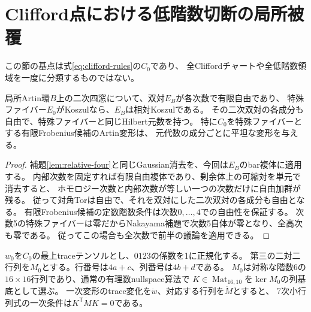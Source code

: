 \section{Clifford点における低階数切断の局所被覆}
\label{sec:clifford-rank-slice}
この節の基点は式\eqref{eq:clifford-rules}の$C_0$であり、
全Cliffordチャートや全低階数領域を一度に分類するものではない。

\begin{lemma}[有限双対のArtin平坦性から元代数の平坦性]\label{lem:dual-artin-flatness}
局所Artin環$B$上の二次四窓について、双対$E_B$が各次数で有限自由であり、
特殊ファイバー$E_0$がKoszulなら、$E_B$は相対Koszulである。
その二次双対の各成分も自由で、特殊ファイバーと同じHilbert元数を持つ。
特に$C_0$を特殊ファイバーとする有限Frobenius候補のArtin変形は、
元代数の成分ごとに平坦な変形を与える。
\end{lemma}
\begin{proof}
補題\ref{lem:relative-four}と同じGaussian消去を、今回は$E_B$のbar複体に適用する。
内部次数を固定すれば有限自由複体であり、剰余体上の可縮対を単元で消去すると、
ホモロジー次数と内部次数が等しい一つの次数だけに自由加群が残る。
従って対角Torは自由で、それを双対にした二次双対の各成分も自由となる。
有限Frobenius候補の定数階数条件は次数$0,\ldots,4$での自由性を保証する。
次数5の特殊ファイバーは零だからNakayama補題で次数5自体が零となり、全高次も零である。
従ってこの場合も全次数で前半の議論を適用できる。
\end{proof}

$w_0$を$C_0$の最上traceテンソルとし、$0123$の係数を1に正規化する。
第三の二対二行列を$M_0$とする。行番号は$4a+c$、列番号は$4b+d$である。
$M_0$は対称な階数6の$16\times16$行列であり、通常の有理数nullspace算法で
$K\in\operatorname{Mat}_{16,10}$を$\ker M_0$の列基底として選ぶ。
一次変形のtrace変化を$\dot w$、対応する行列を$\dot M$とすると、
7次小行列式の一次条件は$K^{\mathsf T}\dot M K=0$である。

